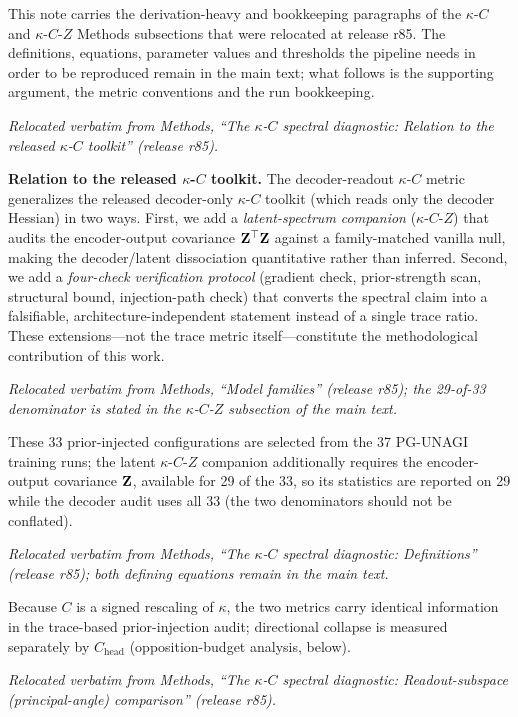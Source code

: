 \documentclass[11 pt,a4 paper]{article}
\begin{document}
This note carries the derivation-heavy and bookkeeping paragraphs of the $\kappa$-$C$ and $\kappa$-$C$-$Z$ Methods subsections that were relocated at release r85. The definitions, equations, parameter values and thresholds the pipeline needs in order to be reproduced remain in the main text; what follows is the supporting argument, the metric conventions and the run bookkeeping.

\noindent\emph{Relocated verbatim from Methods, ``The $\kappa$-$C$ spectral diagnostic: Relation to the released $\kappa$-$C$ toolkit'' (release r85).}

\textbf{Relation to the released $\kappa$-$C$ toolkit.} The decoder-readout $\kappa$-$C$ metric generalizes the released decoder-only $\kappa$-$C$ toolkit (which reads only the decoder Hessian) in two ways. First, we add a \emph{latent-spectrum companion} ($\kappa$-$C$-$Z$) that audits the encoder-output covariance $\mathbf{Z}^\top\mathbf{Z}$ against a family-matched vanilla null, making the decoder/latent dissociation quantitative rather than inferred. Second, we add a \emph{four-check verification protocol} (gradient check, prior-strength scan, structural bound, injection-path check) that converts the spectral claim into a falsifiable, architecture-independent statement instead of a single trace ratio. These extensions---not the trace metric itself---constitute the methodological contribution of this work.

\noindent\emph{Relocated verbatim from Methods, ``Model families'' (release r85); the 29-of-33 denominator is stated in the $\kappa$-$C$-$Z$ subsection of the main text.}

These 33 prior-injected configurations are selected from the 37 PG-UNAGI training runs; the latent $\kappa$-$C$-$Z$ companion additionally requires the encoder-output covariance $\mathbf{Z}$, available for 29 of the 33, so its statistics are reported on 29 while the decoder audit uses all 33 (the two denominators should not be conflated).

\noindent\emph{Relocated verbatim from Methods, ``The $\kappa$-$C$ spectral diagnostic: Definitions'' (release r85); both defining equations remain in the main text.}

Because $C$ is a signed rescaling of $\kappa$, the two metrics carry identical information in the trace-based prior-injection audit; directional collapse is measured separately by $C_{\text{head}}$ (opposition-budget analysis, below).

\noindent\emph{Relocated verbatim from Methods, ``The $\kappa$-$C$ spectral diagnostic: Readout-subspace (principal-angle) comparison'' (release r85).}
\end{document}
